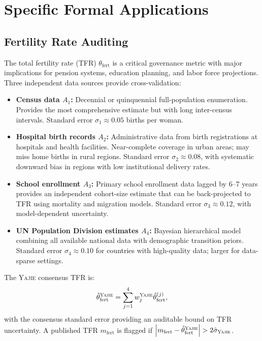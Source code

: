 \documentclass[11pt,a4paper]{article}
\theoremstyle{definition}
\newcommand{\Yajie}{\textsc{Yajie}}
\newcommand{\abs}[1]{\left|#1\right|}
\begin{document}
\section{Specific Formal Applications}
\label{sec:applications}
\subsection{Fertility Rate Auditing}
The total fertility rate (TFR) $\theta_{\mathrm{fert}}$ is a critical governance metric with major implications for pension systems, education planning, and labor force projections. Three independent data sources provide cross-validation:
\begin{itemize}
    \item \textbf{Census data $A_1$:} Decennial or quinquennial full-population enumeration. Provides the most comprehensive estimate but with long inter-census intervals. Standard error $\sigma_1 \approx 0.05$ births per woman.
    \item \textbf{Hospital birth records $A_2$:} Administrative data from birth registrations at hospitals and health facilities. Near-complete coverage in urban areas; may miss home births in rural regions. Standard error $\sigma_2 \approx 0.08$, with systematic downward bias in regions with low institutional delivery rates.
    \item \textbf{School enrollment $A_3$:} Primary school enrollment data lagged by 6--7 years provides an independent cohort-size estimate that can be back-projected to TFR using mortality and migration models. Standard error $\sigma_3 \approx 0.12$, with model-dependent uncertainty.
    \item \textbf{UN Population Division estimates $A_4$:} Bayesian hierarchical model combining all available national data with demographic transition priors. Standard error $\sigma_4 \approx 0.10$ for countries with high-quality data; larger for data-sparse settings.
\end{itemize}
The \Yajie{} consensus TFR is:
\begin{equation}
    \hat{\theta}_{\mathrm{fert}}^{\Yajie} = \sum_{j=1}^{4} w_j^{\Yajie} \hat{\theta}_{\mathrm{fert}}^{(j)},
    \label{eq:fert_consensus}
\end{equation}
with the consensus standard error providing an auditable bound on TFR uncertainty. A published TFR $m_{\mathrm{fert}}$ is flagged if $\abs{m_{\mathrm{fert}} - \hat{\theta}_{\mathrm{fert}}^{\Yajie}} > 2 \hat{\sigma}_{\Yajie}$.
\end{document}
